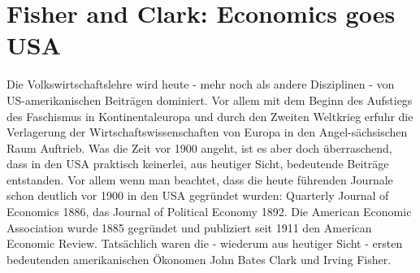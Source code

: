 \section{Fisher and Clark: Economics goes USA}
Die Volkswirtschaftslehre wird heute - mehr noch als andere Disziplinen - von US-amerikanischen Beiträgen dominiert. Vor allem mit dem Beginn des Aufstiegs des Faschismus in Kontinentaleuropa und durch den Zweiten Weltkrieg erfuhr die Verlagerung der Wirtschaftswissenschaften von Europa in den Angel-sächsischen Raum Auftrieb. Was die Zeit vor 1900 angeht, ist es aber doch überraschend, dass in den USA praktisch keinerlei, aus heutiger Sicht, bedeutende Beiträge entstanden. Vor allem wenn man beachtet, dass die heute führenden Journale schon deutlich vor 1900 in den USA gegründet wurden:  Quarterly Journal of Economics 1886, das Journal of Political Economy 1892. Die American Economic Association wurde 1885 gegründet und publiziert seit 1911 den American Economic Review. Tatsächlich waren die - wiederum aus heutiger Sicht - ersten bedeutenden amerikanischen Ökonomen John Bates Clark und Irving Fisher.

